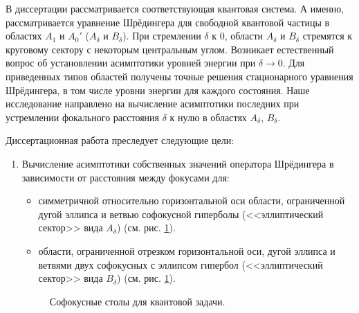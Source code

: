 В диссертации рассматривается соответствующая квантовая система. А именно, рассматривается уравнение Шрёдингера для свободной квантовой частицы в областях $A_1$ и $A_0'$ ($A_\delta$ и $B_\delta$).
При стремлении $\delta$ к $0$, области $A_\delta$ и $B_\delta$  стремятся к круговому сектору с некоторым центральным углом.
Возникает естественный вопрос об установлении асимптотики уровней энергии при $\delta \to 0$. 
Для приведенных типов областей получены точные решения стационарного уравнения Шрёдингера, в том числе  уровни энергии для каждого состояния. Наше исследование направлено на вычисление асимптотики последних при устремлении фокального расстояния $\delta$ к нулю в областях $A_\delta$, $B_\delta$.

{\aim} 
Диссертационная работа преследует следующие цели:
\begin{enumerate}[beginpenalty=10000] %
  \item Вычисление асимптотики собственных значений оператора Шрёдингера в зависимости от расстояния между фокусами для:
  \begin{itemize}[beginpenalty=10000] %
  \item симметричной относительно горизонтальной оси области, ограниченной дугой эллипса и ветвью софокусной  гиперболы (<<эллиптический сектор>> вида $A_\delta$)  (см. рис. \ref{fig:intro_quantum_domains}).
  \item области, ограниченной отрезком горизонтальной оси, дугой эллипса и ветвями двух софокусных с эллипсом гипербол (<<эллиптический сектор>> вида $B_\delta$)  (см. рис. \ref{fig:intro_quantum_domains}).
  \end{itemize}
   \begin{figure}[ht]
    \caption{Софокусные столы для квантовой задачи.}\label{fig:intro_quantum_domains}
\end{figure}
  

\end{enumerate}
